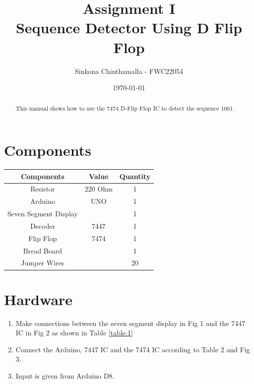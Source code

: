 \documentclass[journal,12pt,twocolumn]{IEEEtran}
\title{Assignment \textrm{I}
\textbf{\\Sequence Detector Using D Flip Flop}}
\author{Sinkona Chinthamalla - FWC22054}
\date{\today}
\begin{document}
\maketitle

\tableofcontents 
\vspace{0.5cm}

\begin{abstract}
This manual shows how to use the 7474 D-Flip Flop IC to detect the sequence 1001.
\end{abstract}

\section{Components}
\begin{tabular}{|c|c|c|}
\hline
Components & Value & Quantity\\
\hline
Resistor & 220 Ohm & 1\\
\hline
Arduino & UNO & 1\\
\hline
Seven Segment Display & & 1\\
\hline
Decoder & 7447 & 1\\
\hline
Flip Flop & 7474 & 1\\
\hline
Bread Board & & 1\\
\hline
Jumper Wires & & 20\\
\hline
\end{tabular}

\section{Hardware}
\begin{enumerate}
\item Make connections between the seven segment display in Fig 1 and the 7447 IC in Fig 2 as shown in Table \ref{table:1}
\item Connect the Arduino, 7447 IC and the 7474 IC according to Table 2 and Fig 3.
\item Input is given from Arduino D8.
\vspace{0.5cm}
\end{enumerate} 
\end{document}
